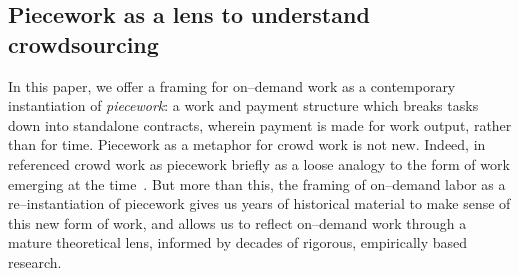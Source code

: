 \documentclass[trackingWork]{subfiles}
\begin{document}
\subsection{Piecework as a lens to understand crowdsourcing}
In this paper, we offer a framing for on--demand work as a contemporary instantiation of \textit{piecework}: %
a work and payment structure which breaks tasks down into standalone contracts,
wherein payment is made for work output, rather than for time.
Piecework as a metaphor for crowd work is not new.
Indeed,
\citeauthor{crowdworkFuture} in \citeyear{crowdworkFuture}
referenced crowd work as piecework briefly
as a loose analogy to the form of work emerging at the time~\cite{crowdworkFuture}.
But more than this,
the framing of on--demand labor as a re--instantiation of piecework
gives us years of historical material to make sense of this new form of work, and allows us to reflect on--demand work through a mature theoretical lens, informed by decades of rigorous, empirically based research.
\end{document}

